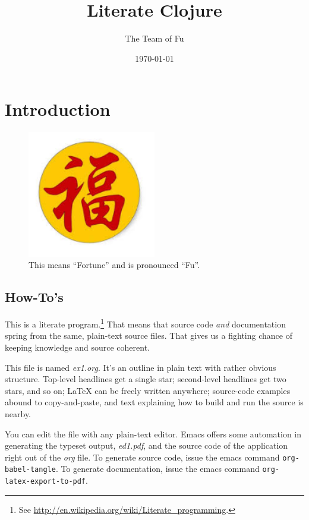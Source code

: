 \documentclass[11pt]{article}
\author{The Team of Fu}
\date{\today}
\title{Literate Clojure}
\begin{document}
\maketitle
\tableofcontents


\section{Introduction}
\label{sec-1}
\begin{figure}
  \centering
  \includegraphics[width=0.5\textwidth]{FuFortune2.png}
  \caption{\label{fig:fufortune}This means ``Fortune'' and is pronounced ``Fu''.}
\end{figure}

\subsection{How-To's}
\label{sec-1-1}
This is a literate program.\footnote{See
  \url{http://en.wikipedia.org/wiki/Literate_programming}.} That means that
source code \emph{and} documentation spring from the same, plain-text
source files. That gives us a fighting chance of keeping knowledge
and source coherent.

This file is named \emph{ex1.org}. It's an outline in plain text with
rather obvious structure. Top-level headlines get a single star;
second-level headlines get two stars, and so on; \LaTeX{} can be
freely written anywhere; source-code examples abound to
copy-and-paste, and text explaining how to build and run the source
is nearby.

You can edit the file with any plain-text editor. Emacs offers some
automation in generating the typeset output, \emph{ed1.pdf}, and the
source code of the application right out of the \emph{org} file. To
generate source code, issue the emacs command
\verb|org-babel-tangle|. To generate documentation, issue the emacs
command \verb|org-latex-export-to-pdf|.
\end{document}
